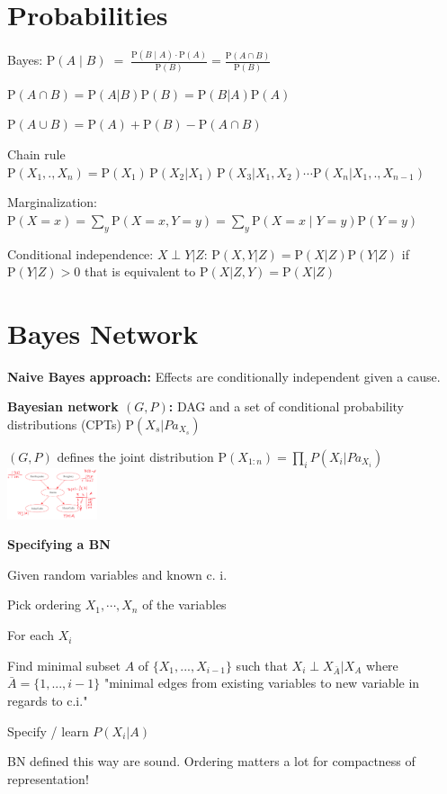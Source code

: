 \documentclass[a4paper, 11pt, landscape]{article}
\newcommand{\uP}{\mathrm P}
\begin{document}
	\begin{multicols*}{3}
		
		\section{Probabilities}
		\begin{compactitem}[]
			\item[] Bayes: $\uP(A\mid B) \; = \; \frac {\uP(B\mid A) \cdot \uP(A)} {\uP(B)} = \frac{\uP(A\cap B)}{\uP(B)}$
			\item[] $\uP(A\cap B) = \uP(A|B)\uP(B) = \uP(B|A)\uP(A)$
			\item[] $\uP(A\cup B)=\uP(A)+\uP(B)-{{\uP(A\cap B)}}$
			\item[] Chain rule $\uP (X_{1},.,X_{n})=\uP(X_{1})\,\uP(X_{2}| X_{1})\,\uP(X_{3}| X_{1},X_{2}) \cdots \uP(X_{n} | X_{1},.,X_{n-1})$
			\item[] Marginalization: $ \uP(X=x)=\sum _{y}\uP(X=x,Y=y)=\sum _{y}\uP(X=x\mid Y=y)\uP(Y=y)$
			\item[] Conditional independence: $X \perp Y | Z$: $\uP(X, Y| Z) = \uP(X|Z) \uP(Y|Z)$ if $\uP(Y|Z) > 0$ that is equivalent to $\uP(X|Z,Y) = \uP(X | Z)$
		\end{compactitem}
	
	
		\section{Bayes Network}
		\textbf{Naive Bayes approach:} Effects are conditionally independent given a cause.
		
		\textbf{Bayesian network $(G,P)$:} DAG and a set of conditional probability distributions (CPTs) $\uP(X_s| Pa_{X_{s}})$
		
		 $(G,P)$ defines the joint distribution $\mathrm {P} (X_{1:n}) = \prod_{i} P(X_i| Pa_{X_{i}})$  
		\includegraphics[height=1.5cm]{img/pai1.png}
		 
		\textbf{Specifying a BN}
		\begin{compactitem}
			\item Given random variables and known c. i.
			\item Pick ordering $X_1, \cdots, X_n$ of the variables
			\item For each $X_i$
			\begin{compactenum}
				\item Find minimal subset $A$ of $\{X_1,...,X_{i-1}\}$ such that $X_i \perp X_{\bar{A}} | X_A$ where $\bar{A} = \{1,...,i-1\}$ "minimal edges from existing variables to new variable in regards to c.i."
				\item Specify / learn $P(X_i|A)$
			\end{compactenum}
		\end{compactitem}
		BN defined this way are sound. Ordering matters a lot for compactness of representation!
		

\end{multicols*}
\end{document}

